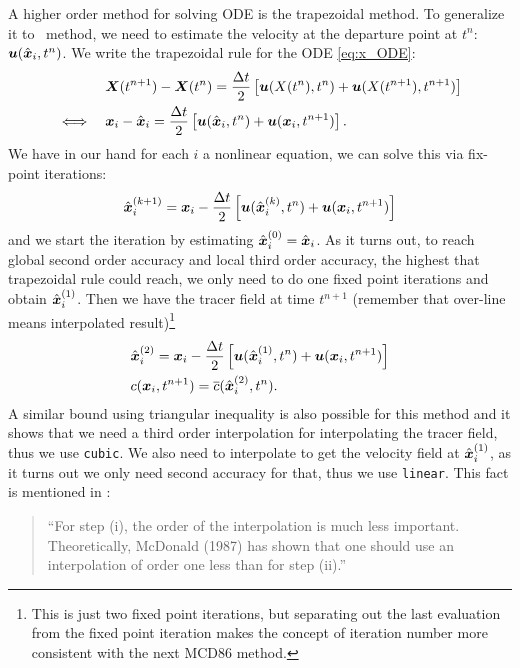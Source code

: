 \documentclass[11pt,letterpaper]{article}
\begin{document}
A higher order method for solving ODE is the trapezoidal method. To generalize it to \sml\ method, we need to estimate the velocity at the departure point at $t^n$: $\boldsymbol{u}(\hat{\boldsymbol{x}}_i,t^n)$. We write the trapezoidal rule for the ODE \eqref{eq:x_ODE}:
\begin{align*}
    &\boldsymbol{X}(t^{n+1})-\boldsymbol{X}(t^{n}) = \frac{\Delta t}{2}\left[\boldsymbol{u}(X(t^{n}),t^n)+\boldsymbol{u}(X(t^{n+1}),t^{n+1})\right]\\
    \iff\quad &\boldsymbol{x}_i-\hat{\boldsymbol{x}}_i = \frac{\Delta t}{2}\left[\boldsymbol{u}(\hat{\boldsymbol{x}}_i,t^n)+\boldsymbol{u}(\boldsymbol{x}_i,t^{n+1})\right].
\end{align*}
We have in our hand for each $i$ a nonlinear equation, we can solve this via fix-point iterations:
\begin{align*}
    \hat{\boldsymbol{x}}_i^{(k+1)} = \boldsymbol{x}_i-\frac{\Delta t}{2}\left[\boldsymbol{u}(\hat{\boldsymbol{x}}_i^{(k)},t^n)+\boldsymbol{u}(\boldsymbol{x}_i,t^{n+1})\right]
\end{align*}
and we start the iteration by estimating $\hat{\boldsymbol{x}}_i^{(0)} = \hat{\boldsymbol{x}}_i$. As it turns out, to reach global second order accuracy and local third order accuracy, the highest that trapezoidal rule could reach, we only need to do one fixed point iterations and obtain $\hat{\boldsymbol{x}}_i^{(1)}$. Then we have the tracer field at time $t^{n+1}$ (remember that over-line means interpolated result)\footnote{This is just two fixed point iterations, but separating out the last evaluation from the fixed point iteration makes the concept of iteration number more consistent with the next MCD86 method.}
\begin{align*}
    &\hat{\boldsymbol{x}}_i^{(2)} = \boldsymbol{x}_i-\frac{\Delta t}{2}\left[\boldsymbol{u}(\hat{\boldsymbol{x}}_i^{(1)},t^n)+\boldsymbol{u}(\boldsymbol{x}_i,t^{n+1})\right]\\
    &c({\boldsymbol{x}}_i,t^{n+1}) = \overline{c}(\hat{\boldsymbol{x}}_i^{(2)},t^{n}).
\end{align*}
A similar bound using triangular inequality is also possible for this method and it shows that we need a third order interpolation for interpolating the tracer field, thus we use \texttt{cubic}. We also need to interpolate to get the velocity field at $\hat{\boldsymbol{x}}_i^{(1)}$, as it turns out we only need second accuracy for that, thus we use \texttt{linear}. This fact is mentioned in \cite{staniforth1991}: 
\begin{quote}
    ``For step (i), the order of the interpolation is much less important. Theoretically, McDonald (1987) has shown that one should use an interpolation of order one less than for step (ii).''
\end{quote}
\end{document}
